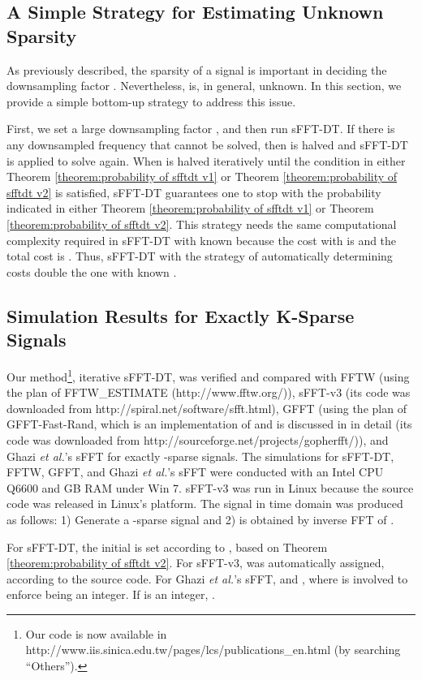 \documentclass[journal,onecolumn,11pt]{IEEEtran}
\begin{document}
\subsection{A Simple Strategy for Estimating Unknown Sparsity  }\label{ssec:how to decide K}
As previously described, the sparsity  of a signal is important in deciding the downsampling factor .
Nevertheless,  is, in general, unknown.
In this section, we provide a simple bottom-up strategy to address this issue.

First, we set a large downsampling factor , and then run sFFT-DT.
If there is any downsampled frequency that cannot be solved, then  is halved and sFFT-DT is applied to solve  again.
When  is halved iteratively until the condition in either Theorem \ref{theorem:probability of sfftdt v1} or Theorem \ref{theorem:probability of sfftdt v2} is satisfied, sFFT-DT guarantees one to stop with the probability indicated in either Theorem \ref{theorem:probability of sfftdt v1} or Theorem \ref{theorem:probability of sfftdt v2}.
This strategy needs the same computational complexity required in sFFT-DT with known  because the cost with  is  and the total cost is .
Thus, sFFT-DT with the strategy of automatically determining  costs double the one with known .


\subsection{Simulation Results for Exactly K-Sparse Signals}\label{Sec: Experimental Results}
Our method\footnote{Our code is now available in http://www.iis.sinica.edu.tw/pages/lcs/publications\_en.html (by searching ``Others'').}, iterative  sFFT-DT, was verified and compared with FFTW (using the plan of FFTW\_ESTIMATE  (http://www.fftw.org/)), sFFT-v3 \cite{Haitham2012} (its code was downloaded from http://spiral.net/software/sfft.html), GFFT (using the plan of GFFT-Fast-Rand, which is an implementation of \cite{Iwen2010} and is discussed in \cite{Segal2012} in detail (its code was downloaded from http://sourceforge.net/projects/gopherfft/)), and Ghazi {\em et al.}'s sFFT \cite{Ghazi2013} for exactly -sparse signals.
The simulations for sFFT-DT, FFTW, GFFT, and Ghazi {\em et al.}'s sFFT were conducted with an Intel CPU Q6600 and  GB RAM under Win 7.
sFFT-v3 was run in Linux because the source code was released in Linux's platform.
The signal  in time domain was produced as follows:
1) Generate a -sparse signal  and
2)  is obtained by inverse FFT of .

For sFFT-DT, the initial  is set according to , based on Theorem \ref{theorem:probability of sfftdt v2}.
For sFFT-v3,  was automatically assigned, according to the source code.
For Ghazi {\em et al.}'s sFFT,  and , where  is involved to enforce  being an integer.
If  is an integer, .
\end{document}
